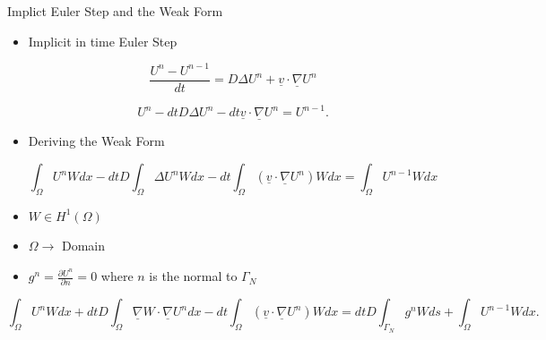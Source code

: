 \documentclass[10pt]{beamer}
\begin{document}
\begin{frame}{Implict Euler Step and the Weak Form}  \label{EulerandWeak}

\begin{itemize}
\item Implicit in time Euler Step
\end{itemize}
\footnotesize
\begin{equation}
\frac{U^{n}-U^{n-1}}{dt}=D\Delta U^{n}+\underline{v} \cdot \underline{\nabla}U^{n}
\end{equation}

\begin{equation}
U^{n}-dtD\Delta U^{n}-dt\underline{v}\cdot \underline{\nabla}U^{n}=U^{n-1}.
\end{equation}
\normalsize
\begin{itemize}
\item Deriving the Weak Form
\end{itemize}
\footnotesize
\begin{equation}
\int_{\Omega}U^{n}W dx -dtD \int_{\Omega}\Delta U^{n}W dx-dt\int_{\Omega}\left(\underline{v}\cdot \underline{\nabla}U^{n}\right)W dx=\int_{\Omega} U^{n-1}W dx
\end{equation}

\begin{itemize}
\item $W \in H^{1}\left({\Omega}\right)$
\item $\Omega \rightarrow$ Domain
\item $g^{n}=\frac{\partial U^{n}}{\partial n}=0$ where $n$ is the normal to $\Gamma_{N}$
\end{itemize}

\begin{equation}
\int_{\Omega}U^{n}W dx +dtD\int_{\Omega}\underline{\nabla}W \cdot \underline{\nabla} U^{n} dx-dt\int_{\Omega}\left(\underline{v}\cdot \underline{\nabla}U^{n}\right)W dx=dtD\int_{\Gamma_{N}}g^{n}W ds+ \int_{\Omega} U^{n-1}W dx.
\end{equation}
\normalsize
\hyperlink{Questions}{}
\end{frame}
\end{document}
